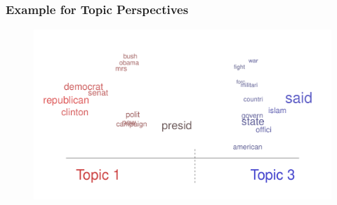 \documentclass{beamer}
\begin{document}
\subsection{}
\begin{frame} %
  \frametitle{Example for Topic Perspectives}
  \begin{figure}
  \includegraphics[width = \textwidth]{../calc/fig/perspective.pdf}
  \end{figure}
\end{frame}
\end{document}

